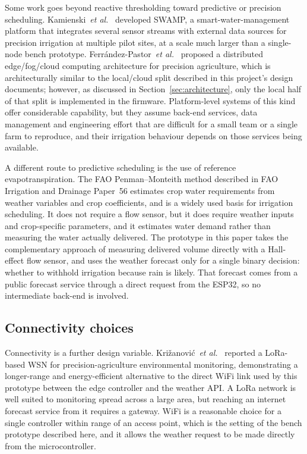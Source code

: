\documentclass[conference]{IEEEtran}
\begin{document}
Some work goes beyond reactive thresholding toward predictive or precision
scheduling. Kamienski~\emph{et al.}~\cite{kamienski2019smart} developed
SWAMP, a smart-water-management platform that integrates several sensor
streams with external data sources for precision irrigation at multiple pilot
sites, at a scale much larger than a single-node bench prototype.
Ferr\'{a}ndez-Pastor~\emph{et al.}~\cite{ferrandez2018precision} proposed a
distributed edge/fog/cloud computing architecture for precision agriculture,
which is architecturally similar to the local/cloud split described in this
project's design documents; however, as discussed in
Section~\ref{sec:architecture}, only the local half of that split is
implemented in the firmware. Platform-level systems of this kind offer
considerable capability, but they assume back-end services, data management
and engineering effort that are difficult for a small team or a single farm to
reproduce, and their irrigation behaviour depends on those services being
available.

A different route to predictive scheduling is the use of reference
evapotranspiration. The FAO Penman--Monteith method described in FAO Irrigation
and Drainage Paper~56 \cite{allen1998fao56} estimates crop water requirements
from weather variables and crop coefficients, and is a widely used basis for
irrigation scheduling. It does not require a flow sensor, but it does require
weather inputs and crop-specific parameters, and it estimates water demand
rather than measuring the water actually delivered. The prototype in this
paper takes the complementary approach of measuring delivered volume directly
with a Hall-effect flow sensor, and uses the weather forecast only for a
single binary decision: whether to withhold irrigation because rain is likely.
That forecast comes from a public forecast service \cite{owm2024forecast}
through a direct request from the ESP32, so no intermediate back-end is
involved.

\subsection{Connectivity choices}

Connectivity is a further design variable. Kri\v{z}anovi\'{c}~\emph{et
al.}~\cite{krizanovic2023lora} reported a LoRa-based WSN for
precision-agriculture environmental monitoring, demonstrating a longer-range
and energy-efficient alternative to the direct WiFi link used by this
prototype between the edge controller and the weather API. A LoRa network is
well suited to monitoring spread across a large area, but reaching an internet
forecast service from it requires a gateway. WiFi is a reasonable choice for a
single controller within range of an access point, which is the setting of the
bench prototype described here, and it allows the weather request to be made
directly from the microcontroller.
\end{document}
